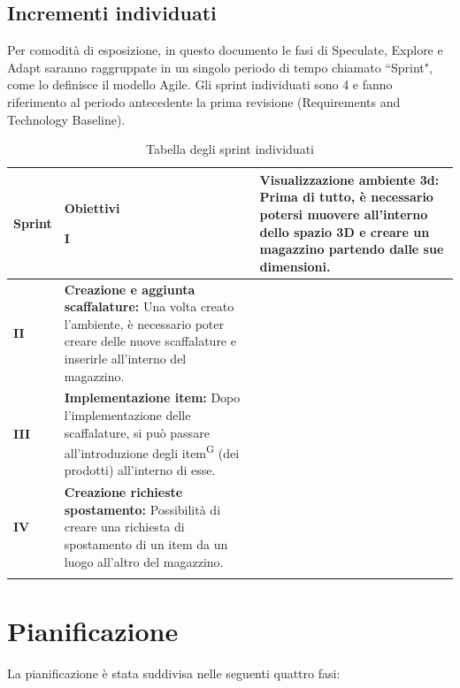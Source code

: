 \subsection{Incrementi individuati}\label{sec:modello_sviluppo:incrementi}
Per comodità di esposizione, in questo documento le fasi di Speculate, Explore e Adapt saranno raggruppate in un singolo periodo di tempo chiamato ``Sprint", come lo definisce il modello Agile.
Gli sprint individuati sono 4 e fanno riferimento al periodo antecedente la prima revisione (Requirements and Technology Baseline).
\begin{xltabular}{\textwidth}{p{0.05\textwidth} | p{0.5\textwidth} }

    \textbf{\color{white} Sprint} & \textbf{\color{white} Obiettivi} \ 
    \hline
    \endhead
    
    \textbf{I} 
    & \textbf{Visualizzazione ambiente 3d:} Prima di tutto, è necessario potersi muovere all'interno dello spazio 3D e creare un magazzino partendo dalle sue dimensioni. \\
    \hline

    \textbf{II} 
    & \textbf{Creazione e aggiunta scaffalature:} Una volta creato l'ambiente, è necessario poter creare delle nuove scaffalature e inserirle all'interno del magazzino. \\
    \hline

    \textbf{III} 
    & \textbf{Implementazione item:} Dopo l'implementazione delle scaffalature, si può passare all'introduzione degli item\textsuperscript{G} (dei prodotti) all'interno di esse. \\
    \hline

    \textbf{IV} 
    & \textbf{Creazione richieste spostamento:} Possibilità di creare una richiesta di spostamento di un item da un luogo all'altro del magazzino. \\
    \hline

\caption{Tabella degli sprint individuati}\label{tab:incrementi}
\end{xltabular}

\newpage
\section{Pianificazione}\label{sec:pianificazione}

La pianificazione è stata suddivisa nelle seguenti quattro fasi:


